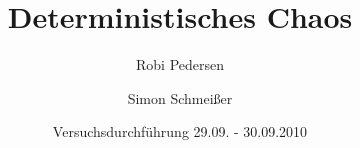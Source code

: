 \documentclass[a4paper,oneside]{scrartcl} %
\title{Deterministisches Chaos}
\author{Robi Pedersen \and Simon Schmeißer}
\date{Versuchsdurchführung 29.09. - 30.09.2010}
\begin{document}
\begin{titlepage}
  \maketitle
  \vfill
  \thispagestyle{empty}
\end{titlepage}

\tableofcontents
\clearpage








\clearpage

% 
%
\end{document}
